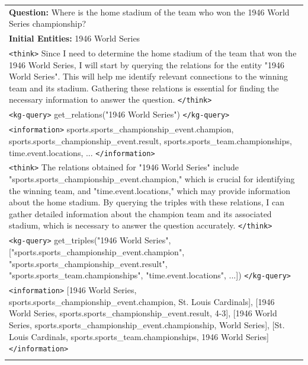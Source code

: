 {\scriptsize
\setlength{\arrayrulewidth}{0.3pt}
\setlength{\tabcolsep}{8pt}
\renewcommand{\arraystretch}{1.3}
\begin{longtable}{>{\raggedright\arraybackslash}p{}}
\toprule
\rowcolor{gray!20}
\textbf{Question:} Where is the home stadium of the team who won the 1946 World Series championship? \\
\rowcolor{gray!20}
\textbf{Initial Entities:} 1946 World Series \\
\midrule
\rowcolor{blue!10}
\texttt{<think>} Since I need to determine the home stadium of the team that won the 1946 World Series, I will start by querying the relations for the entity "1946 World Series". This will help me identify relevant connections to the winning team and its stadium. Gathering these relations is essential for finding the necessary information to answer the question. \texttt{</think>} \\
\rowcolor{green!10}
\texttt{<kg-query>} get\_relations("1946 World Series") \texttt{</kg-query>} \\
\rowcolor{yellow!10}
\texttt{<information>} sports.sports\_championship\_event.champion, sports.sports\_championship\_event.result, sports.sports\_team.championships, time.event.locations, ... \texttt{</information>} \\
\rowcolor{blue!10}
\texttt{<think>} The relations obtained for "1946 World Series" include "sports.sports\_championship\_event.champion," which is crucial for identifying the winning team, and "time.event.locations," which may provide information about the home stadium. By querying the triples with these relations, I can gather detailed information about the champion team and its associated stadium, which is necessary to answer the question accurately. \texttt{</think>} \\
\rowcolor{green!10}
\texttt{<kg-query>} get\_triples("1946 World Series", ["sports.sports\_championship\_event.champion", "sports.sports\_championship\_event.result", "sports.sports\_team.championships", "time.event.locations", ...]) \texttt{</kg-query>} \\
\rowcolor{yellow!10}
\texttt{<information>} [1946 World Series, sports.sports\_championship\_event.champion, St. Louis Cardinals], [1946 World Series, sports.sports\_championship\_event.result, 4-3], [1946 World Series, sports.sports\_championship\_event.championship, World Series], [St. Louis Cardinals, sports.sports\_team.championships, 1946 World Series] \texttt{</information>} \\
\rowcolor{blue!10}

\end{longtable}}
